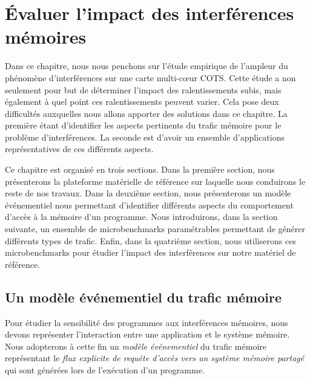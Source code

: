 
\chapter{\label{chapitre:evaluer_impact}Évaluer l'impact des interférences mémoires}



Dans ce chapitre, nous nous penchons sur l'étude empirique de l'ampleur du phénomène d'interférences sur une carte multi-cœur COTS.
Cette étude a non seulement pour but de déterminer l'impact des ralentissements subis, mais également à quel point ces ralentissements peuvent varier.
Cela pose deux difficultés auxquelles nous allons apporter des solutions dans ce chapitre.
La première étant d'identifier les aspects pertinents du trafic mémoire pour le problème d'interférences. 
La seconde est d'avoir un ensemble d'applications représentatives de ces différents aspects.

Ce chapitre est organisé en trois sections.
Dans la première section, nous présenterons la plateforme matérielle de référence sur laquelle nous conduirons le reste de nos travaux.
Dans la deuxième section, nous présenterons un modèle événementiel nous permettant d'identifier différents aspects du comportement d'accès à la mémoire d'un programme.
Nous introduirons, dans la section suivante, un ensemble de microbenchmarks paramétrables permettant de générer différents types de trafic.
Enfin, dans la quatrième section, nous utiliserons ces microbenchmarks pour étudier l'impact des interférences sur notre matériel de référence.



\section{Un modèle événementiel du trafic mémoire}

Pour étudier la sensibilité des programmes aux interférences mémoires, nous devons représenter l'interaction entre une application et le système mémoire.
Nous adopterons à cette fin un \emph{modèle événementiel} du trafic mémoire représentant le \emph{flux explicite de requête d'accès vers un système mémoire partagé} qui sont générées lors de l'exécution d'un programme.

